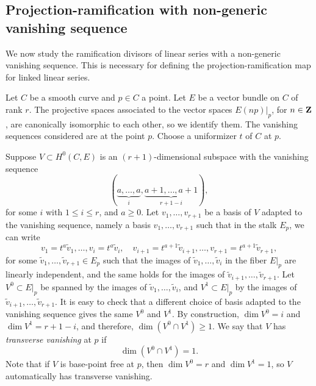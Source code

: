 \subsection{Projection-ramification with non-generic vanishing sequence}
\label{sec:prnongeneric}
We now study the ramification divisors of linear series with a non-generic vanishing sequence.
This is necessary for defining the projection-ramification map for linked linear series.

Let $C$ be a smooth curve and $p \in C$ a point.
Let $E$ be a vector bundle on $C$ of rank $r$.
The projective spaces associated to the vector spaces $E(np)|_p$, for $n \in {\bf Z}$, are canonically isomorphic to each other, so we identify them.
The vanishing sequences considered are at the point $p$.
Choose a uniformizer $t$ of $C$ at $p$.

Suppose $V \subset H^0(C, E)$ is an $(r+1)$-dimensional subspace with the vanishing sequence 
\begin{equation}\label{eqn:specialvs}
  (\underbrace{a, \dots, a}_{i}, \underbrace{a+1, \dots, a+1}_{r+1-i}),
\end{equation}
for some $i$ with $1 \leq i \leq r$, and $a \geq 0$.
Let $v_1, \dots, v_{r+1}$ be a basis of $V$ adapted to the vanishing sequence, namely a basis $v_1, \dots, v_{r+1}$ such that in the stalk $E_p$, we can write
\begin{equation}\label{eqn:basis}
  v_1 = t^a \widetilde v_1, \dots, v_{i} = t^a \widetilde v_i,\quad v_{i+1} = t^{a+1} \widetilde v_{i+1}, \dots, v_{r+1} = t^{a+1} \widetilde v_{r+1},
\end{equation}
for some $\widetilde v_1, \dots, \widetilde v_{r+1} \in E_p$ such that the images of $\widetilde v_1, \dots, \widetilde v_i$ in the fiber $E|_p$ are linearly independent, and the same holds for the images of $\widetilde v_{i+1}, \dots, \widetilde v_{r+1}$.
Let $V^0 \subset E|_p$ be spanned by the images of $\widetilde v_1, \dots, \widetilde v_i$, and $V^1 \subset E|_p$ by the images of $\widetilde v_{i+1}, \dots, \widetilde v_{r+1}$.
It is easy to check that a different choice of basis adapted to the vanishing sequence gives the same $V^0$ and $V^1$.
By construction, $\dim V^0 = i$ and $\dim V^1 = r+1-i$, and therefore, $\dim (V^0 \cap V^1) \geq 1$.
We say that $V$ has \emph{transverse vanishing} at $p$ if 
\begin{equation}\label{eq:genericity}
  \dim (V^0 \cap V^1) = 1.
\end{equation}
Note that if $V$ is base-point free at $p$, then $\dim V^0 = r$ and $\dim V^1 = 1$, so $V$ automatically has transverse vanishing.

